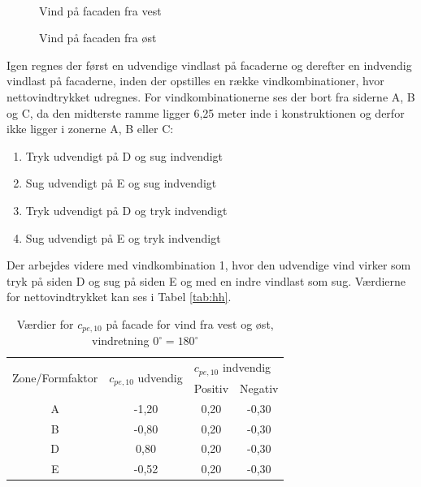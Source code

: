 \begin{figure}[htbp]
\begin{minipage}[b]{0.48\textwidth}
	\end{minipage}\\ %
	\begin{minipage}[t]{0.48\textwidth}
		\caption{Vind på facaden fra vest \citep[ 7.2.2]{EU91}} %
		\label{fig:vindvest}
	\end{minipage}\hfill
	\begin{minipage}[t]{0.48\textwidth}
		\caption{Vind på facaden fra øst \citep[ 7.2.2]{EU91}} %
		\label{fig:vindost}
	\end{minipage}
\end{figure}

Igen regnes der først en udvendige vindlast på facaderne og derefter en indvendig vindlast på facaderne, inden der opstilles en række vindkombinationer, hvor nettovindtrykket udregnes. For vindkombinationerne ses der bort fra siderne A, B og C, da den midterste ramme ligger 6,25 meter inde i konstruktionen og derfor ikke ligger i zonerne A, B eller C:
\begin{enumerate}
	\item Tryk udvendigt på D og sug indvendigt
	\item Sug udvendigt på E og sug indvendigt
	\item Tryk udvendigt på D og tryk indvendigt  
	\item Sug udvendigt på E og tryk indvendigt
\end{enumerate}

Der arbejdes videre med vindkombination 1, hvor den udvendige vind virker som tryk på siden D og sug på siden E og med en indre vindlast som sug.
\newline \indent{     }  Værdierne for nettovindtrykket kan ses i Tabel \ref{tab:hh}.

\begin{table}[htb]
	\begin{center}
		\begin{tabular}{ c c c c } 
			\hline
			\multirow{2}{*}{Zone/Formfaktor} & \multirow{2}{*}{$c_{pe,10}$ udvendig} & \multicolumn{2}{l}{$c_{pe,10}$ indvendig} \\ 
			& & Positiv & Negativ   		\\ \hline
			A & -1,20 & 0,20 & -0,30 \\	
			B & -0,80 & 0,20 & -0,30 \\	 
			D & 0,80 & 0,20 & -0,30 \\	
			E & -0,52 & 0,20 & -0,30 \\	
		\end{tabular}
		\caption{Værdier for $c_{pe,10}$ på facade for vind fra vest og øst, vindretning $0^{\circ} = 180^{\circ}$}
		\label{tab:ff}
	\end{center}
\end{table}

